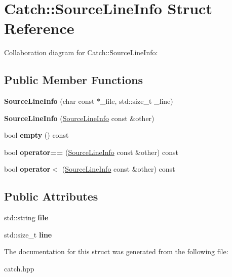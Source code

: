 \hypertarget{structCatch_1_1SourceLineInfo}{}\section{Catch\+:\+:Source\+Line\+Info Struct Reference}
\label{structCatch_1_1SourceLineInfo}


Collaboration diagram for Catch\+:\+:Source\+Line\+Info\+:
\subsection*{Public Member Functions}
\begin{DoxyCompactItemize}
\item 
{\bfseries Source\+Line\+Info} (char const $\ast$\+\_\+file, std\+::size\+\_\+t \+\_\+line)\hypertarget{structCatch_1_1SourceLineInfo_a6218cb890337d37f708ea94063958940}{}\label{structCatch_1_1SourceLineInfo_a6218cb890337d37f708ea94063958940}

\item 
{\bfseries Source\+Line\+Info} (\hyperlink{structCatch_1_1SourceLineInfo}{Source\+Line\+Info} const \&other)\hypertarget{structCatch_1_1SourceLineInfo_a1ec99cc0547ce5909133aaa8f14ed4b1}{}\label{structCatch_1_1SourceLineInfo_a1ec99cc0547ce5909133aaa8f14ed4b1}

\item 
bool {\bfseries empty} () const \hypertarget{structCatch_1_1SourceLineInfo_a9a25ffc0640d1a3dd0c9b7e5fcbba7b9}{}\label{structCatch_1_1SourceLineInfo_a9a25ffc0640d1a3dd0c9b7e5fcbba7b9}

\item 
bool {\bfseries operator==} (\hyperlink{structCatch_1_1SourceLineInfo}{Source\+Line\+Info} const \&other) const \hypertarget{structCatch_1_1SourceLineInfo_af0854821b1abfda52796ef0f1294b050}{}\label{structCatch_1_1SourceLineInfo_af0854821b1abfda52796ef0f1294b050}

\item 
bool {\bfseries operator$<$} (\hyperlink{structCatch_1_1SourceLineInfo}{Source\+Line\+Info} const \&other) const \hypertarget{structCatch_1_1SourceLineInfo_a581c02d683808232168bfc2e775c3554}{}\label{structCatch_1_1SourceLineInfo_a581c02d683808232168bfc2e775c3554}

\end{DoxyCompactItemize}
\subsection*{Public Attributes}
\begin{DoxyCompactItemize}
\item 
std\+::string {\bfseries file}\hypertarget{structCatch_1_1SourceLineInfo_adf3ccf0c2bd326eb3466318af82a94dd}{}\label{structCatch_1_1SourceLineInfo_adf3ccf0c2bd326eb3466318af82a94dd}

\item 
std\+::size\+\_\+t {\bfseries line}\hypertarget{structCatch_1_1SourceLineInfo_a841e5d696c7b9cde24e45e61dd979c77}{}\label{structCatch_1_1SourceLineInfo_a841e5d696c7b9cde24e45e61dd979c77}

\end{DoxyCompactItemize}


The documentation for this struct was generated from the following file\+:\begin{DoxyCompactItemize}
\item 
catch.\+hpp\end{DoxyCompactItemize}
